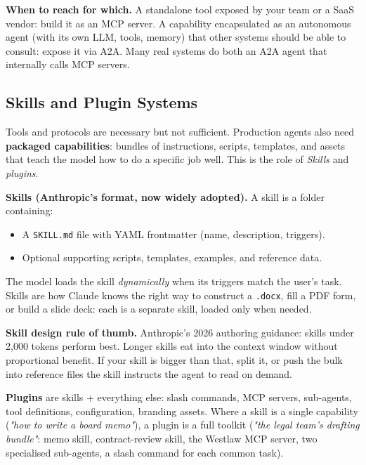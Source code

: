 \documentclass[a4paper,11pt]{article}
\begin{document}
\textbf{When to reach for which.} A standalone tool exposed by your
team or a SaaS vendor: build it as an MCP server. A capability
encapsulated as an autonomous agent (with its own LLM, tools, memory)
that other systems should be able to consult: expose it via A2A.
Many real systems do both \textemdash{} an A2A agent that internally
calls MCP servers.

\subsection{Skills and Plugin Systems}

Tools and protocols are necessary but not sufficient. Production
agents also need \textbf{packaged capabilities}: bundles of
instructions, scripts, templates, and assets that teach the model how
to do a specific job well. This is the role of \textit{Skills} and
\textit{plugins}.

\textbf{Skills (Anthropic's format, now widely adopted).} A skill is
a folder containing:

\begin{itemize}[noitemsep, leftmargin=1.2em]
  \item A \texttt{SKILL.md} file with YAML frontmatter (name,
        description, triggers).
  \item Optional supporting scripts, templates, examples, and
        reference data.
\end{itemize}

The model loads the skill \emph{dynamically} when its triggers match
the user's task. Skills are how Claude knows the right way to
construct a \texttt{.docx}, fill a PDF form, or build a slide deck:
each is a separate skill, loaded only when needed.

\begin{ambercallout}
\textbf{Skill design rule of thumb.}
Anthropic's 2026 authoring guidance: skills under 2{,}000 tokens
perform best. Longer skills eat into the context window without
proportional benefit. If your skill is bigger than that, split it,
or push the bulk into reference files the skill instructs the agent
to read on demand.
\end{ambercallout}

\textbf{Plugins} are skills + everything else: slash commands, MCP
servers, sub-agents, tool definitions, configuration, branding
assets. Where a skill is a single capability (\textit{"how to write
a board memo"}), a plugin is a full toolkit (\textit{"the legal
team's drafting bundle"}: memo skill, contract-review skill, the
Westlaw MCP server, two specialised sub-agents, a slash command for
each common task).
\end{document}
